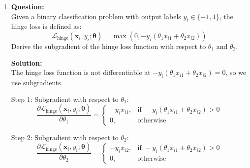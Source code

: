 \documentclass{article}
\begin{document}
\begin{enumerate}
Step 2: Differentiate with respect to \(\theta_2\):

The process of differentiating with respect to \(\theta_2\) is symmetric to the steps outlined above for \(\theta_1\). Thus, we have:
\[
\frac{\partial \mathcal{L}_{\text{CE}}(\mathbf{\theta})}{\partial \theta_2} = -\frac{1}{N} \sum_{i=1}^{N} \left( y_i - \hat{y}_i \right) x_{i2}
\]

Conclusion:

The gradient of the Cross-Entropy loss function with respect to the parameter vector \(\mathbf{\theta} = [\theta_1, \theta_2]^T\) is:
\[
\nabla_{\mathbf{\theta}} \mathcal{L}_{\text{CE}}(\mathbf{\theta}) = \frac{\partial \mathcal{L}_{\text{CE}}(\mathbf{\theta})}{\partial \mathbf{\theta}} = -\frac{1}{N} \sum_{i=1}^{N} \begin{bmatrix} x_{i1} \\ x_{i2} \end{bmatrix} \left( y_i - \sigma(\theta_1 x_{i1} + \theta_2 x_{i2}) \right) = -\frac{1}{N} \sum_{i=1}^{N} \left( y_i - \hat{y}_i \right) \mathbf{x}
\]
This gradient can then be used in gradient descent to update the parameters \(\mathbf{\theta}\) during the optimization process.


\item \textbf{Question:} \\
Given a binary classification problem with output labels \( y_i \in \{-1, 1\} \), the hinge loss is defined as:
\[
\mathcal{L}_{\text{hinge}}(\mathbf{x}_i, y_i; \mathbf{\theta}) = \max(0,  - y_i (\theta_1 x_{i1} + \theta_2 x_{i2}))
\]
Derive the subgradient of the hinge loss function with respect to \(\theta_1\) and \(\theta_2\).

\textbf{Solution:} \\
The hinge loss function is not differentiable at \( - y_i (\theta_1 x_{i1} + \theta_2 x_{i2}) = 0\), so we use subgradients.

Step 1: Subgradient with respect to \(\theta_1\):
\[
\frac{\partial \mathcal{L}_{\text{hinge}}(\mathbf{x}_i, y_i; \mathbf{\theta})}{\partial \theta_1} = 
\begin{cases}
    -y_i x_{i1}, & \text{if }  - y_i (\theta_1 x_{i1} + \theta_2 x_{i2}) > 0 \\
    0, & \text{otherwise}
\end{cases}
\]

Step 2: Subgradient with respect to \(\theta_2\):
\[
\frac{\partial \mathcal{L}_{\text{hinge}}(\mathbf{x}_i, y_i; \mathbf{\theta})}{\partial \theta_2} = 
\begin{cases}
    -y_i x_{i2}, & \text{if }  - y_i (\theta_1 x_{i1} + \theta_2 x_{i2}) > 0 \\
    0, & \text{otherwise}
\end{cases}
\]


\end{enumerate}
\end{document}
